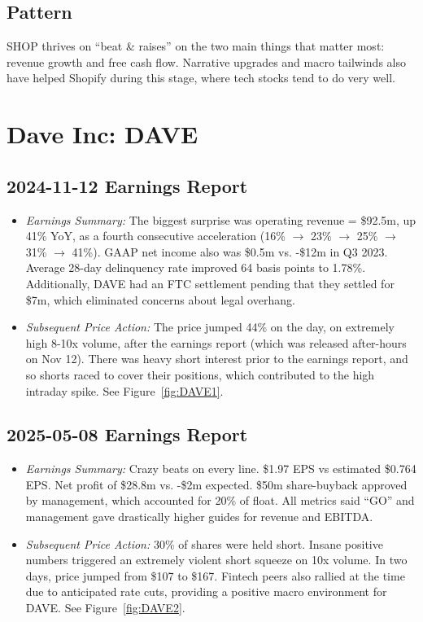 \documentclass[11pt]{article}
\begin{document}
    \subsection{Pattern}
        SHOP thrives on ``beat \& raises'' on the two main things that matter most: revenue growth and free cash flow. Narrative upgrades and macro tailwinds also have helped Shopify during this stage, where tech stocks tend to do very well.
\section{Dave Inc: DAVE}
    \subsection{2024-11-12 Earnings Report}
        \begin{itemize}
            \item \textit{Earnings Summary:} The biggest surprise was operating revenue = \$92.5m, up 41\% YoY, as a fourth consecutive acceleration (16\% $\rightarrow$ 23\% $\rightarrow$ 25\% $\rightarrow$ 31\% $\rightarrow$ 41\%). GAAP net income also was \$0.5m vs. -\$12m in Q3 2023. Average 28-day delinquency rate improved 64 basis points to 1.78\%. Additionally, DAVE had an FTC settlement pending that they settled for \$7m, which eliminated concerns about legal overhang.
            \item \textit{Subsequent Price Action:} The price jumped 44\% on the day, on extremely high 8-10x volume, after the earnings report (which was released after-hours on Nov 12). There was heavy short interest prior to the earnings report, and so shorts raced to cover their positions, which contributed to the high intraday spike. See Figure~\ref{fig:DAVE1}.
        \end{itemize}
    \subsection{2025-05-08 Earnings Report}
        \begin{itemize}
            \item \textit{Earnings Summary:} Crazy beats on every line. \$1.97 EPS vs estimated \$0.764 EPS. Net profit of \$28.8m vs. -\$2m expected. \$50m share-buyback approved by management, which accounted for 20\% of float. All metrics said ``GO'' and management gave drastically higher guides for revenue and EBITDA.
            \item \textit{Subsequent Price Action:} 30\% of shares were held short. Insane positive numbers triggered an extremely violent short squeeze on 10x volume. In two days, price jumped from \$107 to \$167. Fintech peers also rallied at the time due to anticipated rate cuts, providing a positive macro environment for DAVE. See Figure~\ref{fig:DAVE2}.  \end{itemize}
\end{document}

